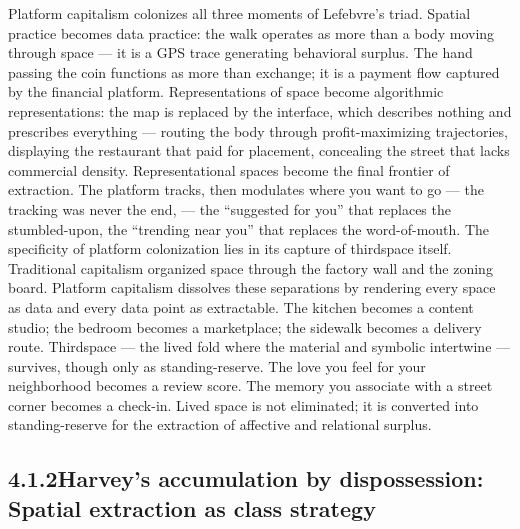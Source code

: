 Platform capitalism colonizes all three moments of Lefebvre’s triad. Spatial practice becomes data practice: the walk operates as more than a body moving through space — it is a GPS trace generating behavioral surplus. The hand passing the coin functions as more than exchange; it is a payment flow captured by the financial platform. Representations of space become algorithmic representations: the map is replaced by the interface, which describes nothing and prescribes everything — routing the body through profit-maximizing trajectories, displaying the restaurant that paid for placement, concealing the street that lacks commercial density. Representational spaces become the final frontier of extraction. The platform tracks, then modulates where you want to go — the tracking was never the end, — the “suggested for you” that replaces the stumbled-upon, the “trending near you” that replaces the word-of-mouth. The specificity of platform colonization lies in its capture of thirdspace itself. Traditional capitalism organized space through the factory wall and the zoning board. Platform capitalism dissolves these separations by rendering every space as data and every data point as extractable. The kitchen becomes a content studio; the bedroom becomes a marketplace; the sidewalk becomes a delivery route. Thirdspace — the lived fold where the material and symbolic intertwine — survives, though only as standing-reserve. The love you feel for your neighborhood becomes a review score. The memory you associate with a street corner becomes a check-in. Lived space is not eliminated; it is converted into standing-reserve for the extraction of affective and relational surplus.

\subsection{4.1.2\quad Harvey’s accumulation by dispossession: Spatial extraction as class strategy}

